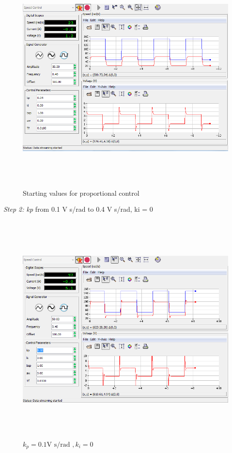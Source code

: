 \documentclass[]{article}
\begin{document}
\begin{figure}\includegraphics[width=6.50000in,height=4.66667in]{media/image39.png} \caption{Starting values for proportional control} \end{figure} 

\emph{Step 2: kp} from 0.1 V s/rad to 0.4 V s/rad, ki = 0

\begin{figure}\includegraphics[width=6.50000in,height=4.65278in]{media/image37.png} \caption{$k_p = 0.1 \text{V s/rad }, k_i = 0$} \end{figure} 
\end{document}

